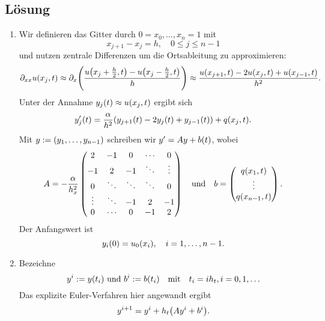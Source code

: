 \documentclass{exercise}
\begin{document}
    \subsection*{Lösung}
    \begin{enumerate}
        \item Wir definieren das Gitter durch \(0 = x_0, \ldots, x_n = 1\) mit
        \[
            x_{j + 1} - x_j = h, \quad 0 \le j \le n - 1
        \]
        und nutzen zentrale Differenzen um die Ortsableitung zu approximieren:
        \[
            \partial_{xx}u\parentheses*{x_j, t} \approx \partial_x\parentheses*{\frac{u\parentheses*{x_j + \frac{h}{2}, t} - u\parentheses*{x_j - \frac{h}{2}, t}}{h}} \approx \frac{u\parentheses*{x_{j + 1}, t} - 2u\parentheses*{x_j, t} + u\parentheses*{x_{j - 1}, t}}{h^2}.
        \]
        Unter der Annahme \(y_j\parentheses*{t} \approx u\parentheses*{x_j, t}\) ergibt sich
        \[
            y_j'\parentheses*{t} = \frac{\alpha}{h^2}\parentheses*{y_{j + 1}\parentheses*{t} - 2y_j\parentheses*{t} + y_{j - 1}\parentheses*{t}} + q\parentheses*{x_j, t}.
        \]
        Mit \(y := \parentheses*{y_1, \ldots, y_{n - 1}}\) schreiben wir \(y' = Ay + b\parentheses*{t}\), wobei
        \[
            A = -\frac{\alpha}{h_x^2}\begin{pmatrix}
                2 & -1 & 0 & \cdots & 0\\
                -1 & 2 & -1 & \ddots & \vdots\\
                0 & \ddots & \ddots & \ddots & 0\\
                \vdots & \ddots & -1 & 2 & -1\\
                0 & \cdots & 0 & -1 & 2
            \end{pmatrix} \quad \text{und} \quad b = \begin{pmatrix}
                q\parentheses*{x_1, t}\\
                \vdots\\
                q\parentheses*{x_{n - 1}, t}
            \end{pmatrix}.
        \]
        Der Anfangswert ist
        \[
            y_i\parentheses*{0} = u_0\parentheses*{x_i}, \quad i = 1, \ldots, n - 1.
        \]
        \item Bezeichne
        \[
            y^i := y\parentheses*{t_i}\text{ und }b^i := b\parentheses*{t_i} \quad \text{mit} \quad t_i = ih_t, i = 0, 1, \ldots
        \]
        Das explizite Euler-Verfahren hier angewandt ergibt
        \[
            y^{i + 1} = y^i + h_t\parentheses*{Ay^i + b^i}.
\]
\end{enumerate}
\end{document}
